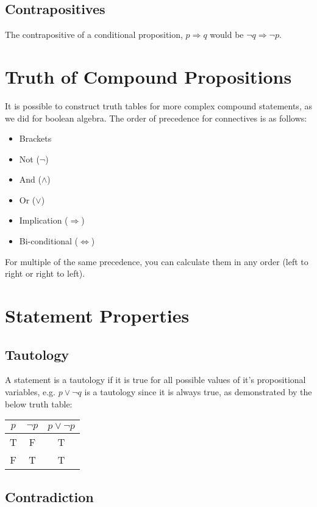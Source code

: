 \subsection*{Contrapositives}

The contrapositive of a conditional proposition, $p \Rightarrow q$ would be $\neg q \Rightarrow \neg p$.

\section*{Truth of Compound Propositions}

It is possible to construct truth tables for more complex compound statements, as we did for boolean algebra. The order
 of precedence for connectives is as follows:
\begin{itemize}
  \item Brackets
  \item Not ($\neg$)
  \item And ($\wedge$)
  \item Or ($\vee$)
  \item Implication ($\Rightarrow$)
  \item Bi-conditional ($\Leftrightarrow$)
\end{itemize}
For multiple of the same precedence, you can calculate them in any order (left to right or right to left).

\section*{Statement Properties}

\subsection*{Tautology}

A statement is a tautology if it is true for all possible values of it's propositional variables, e.g. $p \vee \neg q$
 is a tautology since it is always true, as demonstrated by the below truth table:
\begin{table}[h]
  \centering
  \begin{tabular}{ c c c }
    $p$ & $\neg p$ & $p \vee \neg p$ \\
    \hline
    T & F & T \\
    F & T & T \\
  \end{tabular}
\end{table}

\subsection*{Contradiction}

